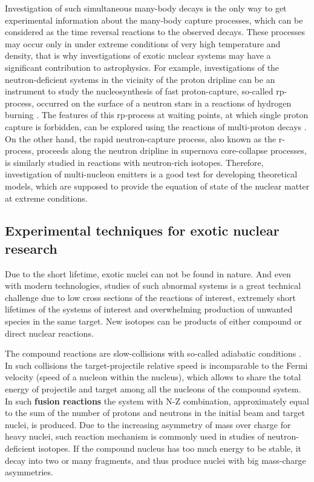Investigation of such simultaneous many-body decays is the only way to get experimental information about the many-body capture processes, which can be considered as the time reversal reactions to the observed decays.
These processes may occur only in under extreme conditions of very high temperature and density, that is why investigations of exotic nuclear systems may have a significant contribution to astrophysics.
For example, investigations of the neutron-deficient systems in the vicinity of the proton dripline can be an instrument to study the nucleosynthesis of fast proton-capture, so-called rp-process, occurred on the surface of a neutron stars in a reactions of hydrogen burning \cite{GrigorenkoUFN:2019,Grigorenko:2009b,Grigorenko:2006,Grigorenko:2005a,Schatz:1998}. 
The features of this rp-process at waiting points, at which single proton capture is forbidden, can be explored using the reactions of multi-proton decays \cite{Gorres:1995}.
On the other hand, the rapid neutron-capture process, also known as the r-process, proceeds along the neutron dripline in supernova core-collapse processes, is similarly studied in reactions with neutron-rich isotopes.
Therefore, investigation of multi-nucleon emitters is a good test for developing theoretical models, which are supposed to provide the equation of state of the nuclear matter at extreme conditions. 

\subsection{Experimental techniques for exotic nuclear research}

Due to the short lifetime, exotic nuclei can not be found in nature.
And even with modern technologies, studies of such abnormal systems is a great technical challenge due to low cross sections of the reactions of interest, extremely short lifetimes of the systems of interest and overwhelming production of unwanted species in the same target.
New isotopes can be products of either compound or direct nuclear reactions.

The compound reactions are slow-collisions with so-called adiabatic conditions \cite{Zagrebaev:2019}.
In such collisions the target-projectile relative speed is incomparable to the Fermi velocity (speed of a nucleon within the nucleus), which allows to share the total energy of projectile and target among all the nucleons of the compound system.
In such \textbf{fusion reactions} the system with N-Z combination, approximately equal to the sum of the number of protons and neutrons in the initial beam and target nuclei, is produced.
Due to the increasing asymmetry of mass over charge for heavy nuclei, such reaction mechanism is commonly used in studies of neutron-deficient isotopes.
If the compound nucleus has too much energy to be stable, it decay into two or many fragments, and thus produce nuclei with big mass-charge asymmetries.

